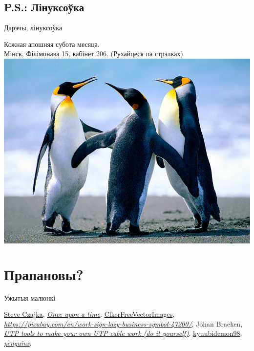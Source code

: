 \documentclass[ignorenonframetext,hyperref={pdftex,unicode}]{beamer}
\begin{document}
\subsection{P.S.: Лінуксоўка}
\begin{frame}{Дарэчы, лінуксоўка}
	\begin{center}
		Кожная апошняя субота месяца.\\
		Мінск, Філімонава 15, кабінет 206. (Рухайцеся па стрэлках)
		\includegraphics[width=\textwidth,height=0.8\textheight,keepaspectratio]{penguins_by_kyuubidemon98}
	\end{center}
\end{frame}

\section{Прапановы?}

\begin{frame}{Ужытыя малюнкі}
	\begin{thebibliography}{10}
	\beamertemplatebookbibitems
		{\sc \href{https://www.flickr.com/photos/steveczajka/}{Steve Czajka}}, {\em \href{https://www.flickr.com/photos/steveczajka/11392783794}{Once upon a time}}.
		{\sc \href{https://pixabay.com/en/users/ClkerFreeVectorImages-3736/}{ClkerFreeVectorImages}}, {\em \url{https://pixabay.com/en/work-sign-lazy-business-symbol-47200/}}.
		{\sc Johan Braeken}, {\em \href{https://commons.wikimedia.org/wiki/File:Utp_diy_tools.jpg}{UTP tools to make your own UTP cable work (do it yourself)}}.
		{\sc \href{http://kyuubidemon98.deviantart.com/}{kyuubidemon98}}, {\em \href{http://kyuubidemon98.deviantart.com/art/penguins-156283137}{penguins}}.
	\end{thebibliography}
\end{frame}
\end{document}
